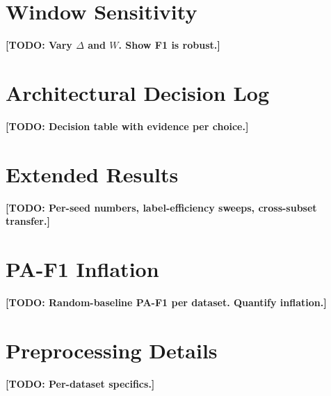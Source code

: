 \documentclass{article}
\newcommand{\todo}[1]{{\color{orange}\textbf{[TODO: #1]}}}
\newcommand{\todo}[1]{}
\begin{document}
\appendix

\section{Window Sensitivity}
\label{app:window_sensitivity}
\todo{Vary $\Delta$ and $W$. Show F1 is robust.}

\section{Architectural Decision Log}
\label{app:decisions}
\todo{Decision table with evidence per choice.}

\section{Extended Results}
\label{app:extended}
\todo{Per-seed numbers, label-efficiency sweeps, cross-subset transfer.}

\section{PA-F1 Inflation}
\label{app:pa_f1}
\todo{Random-baseline PA-F1 per dataset. Quantify inflation.}

\section{Preprocessing Details}
\label{app:preprocessing}
\todo{Per-dataset specifics.}
\end{document}
